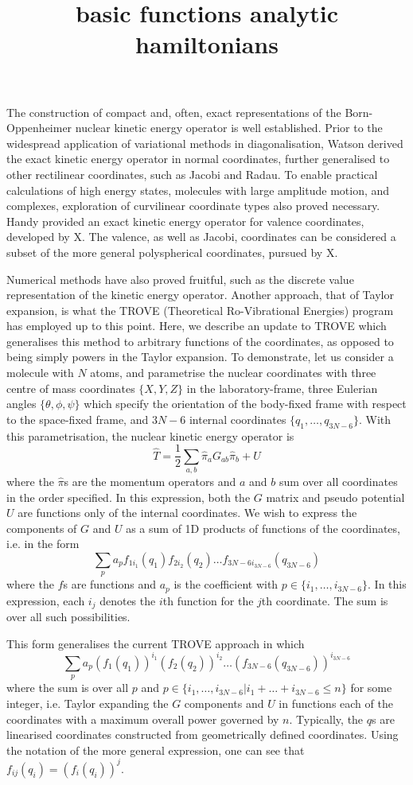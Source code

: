 \documentclass{article}
\title{basic functions analytic hamiltonians}
\begin{document}
The construction of compact and, often, exact representations of the Born-Oppenheimer nuclear kinetic energy operator is well established. Prior to the widespread application of variational methods in diagonalisation, Watson derived the exact kinetic energy operator in normal coordinates, further generalised to other rectilinear coordinates, such as Jacobi and Radau. To enable practical calculations of high energy states, molecules with large amplitude motion, and complexes, exploration of curvilinear coordinate types also proved necessary. Handy provided an exact kinetic energy operator for valence coordinates, developed by X. The valence, as well as Jacobi, coordinates can be considered a subset of the more general polyspherical coordinates, pursued by X. 

Numerical methods have also proved fruitful, such as the discrete value representation of the kinetic energy operator. Another approach, that of Taylor expansion, is what the TROVE (Theoretical Ro-Vibrational Energies) program has employed up to this point. Here, we describe an update to TROVE which generalises this method to arbitrary functions of the coordinates, as opposed to being simply powers in the Taylor expansion. 
To demonstrate, let us consider a molecule with $N$ atoms, and parametrise the nuclear coordinates with three centre of mass coordinates $\{X,Y,Z\}$ in the laboratory-frame, three Eulerian angles $\{\theta, \phi, \psi\}$ which specify the orientation of the body-fixed frame with respect to the space-fixed frame, and $3N-6$ internal coordinates $\{q_1, \ldots, q_{3N-6}\}$. With this parametrisation, the nuclear kinetic energy operator is  
\[
\hat{T}= \dfrac12 \sum_{a,b}\hat{\pi}_a G_{ab}\hat{\pi}_b + U
\]
where the $\hat{\pi}$s are the momentum operators and $a$ and $b$ sum over all coordinates in the order specified. In this expression, both the $G$ matrix and pseudo potential $U$ are functions only of the internal coordinates. We wish to express the components of $G$ and $U$ as a sum of 1D products of functions of the coordinates, i.e. in the form
\[
\sum_{p} a_p f_{1i_1}(q_1)f_{2i_2}(q_2)\ldots f_{3N-6 i_{3N-6}}(q_{3N-6})
\]
where the $f$s are functions and $a_p$ is the coefficient with $p\in \{i_1, \ldots, i_{3N-6}\}$. In this expression, each $i_j$ denotes the $i$th function for the $j$th coordinate. The sum is over all such possibilities.
 
This form generalises the current TROVE approach in which 
\[
\sum_{p} a_p (f_1(q_1))^{i_1} (f_2(q_2))^{i_2} \ldots (f_{3N-6}(q_{3N-6}))^{i_{3N-6}}
\]
where the sum is over all $p$ and $p \in \{ i_1, \dots, i_{3N-6} | i_1 + \ldots + i_{3N-6} \leq n\}$ for some integer, i.e. Taylor expanding the $G$ components and $U$ in functions each of the coordinates with a maximum overall power governed by $n$. Typically, the $q$s are linearised coordinates constructed from geometrically defined coordinates. Using the notation of the more general expression, one can see that $f_{ij}(q_i) = (f_{i}(q_i))^j$. 
\end{document}
